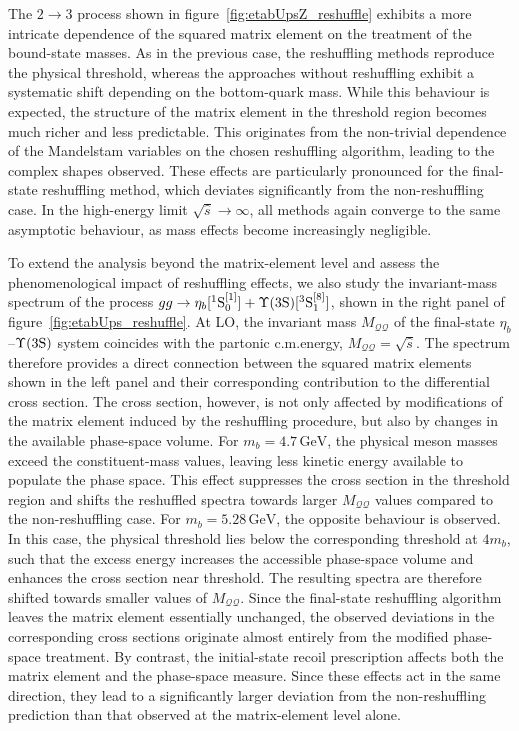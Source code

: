 The $2\to3$ process shown in figure~\ref{fig:etabUpsZ_reshuffle} exhibits a more intricate dependence of the squared matrix element on the treatment of the bound-state masses. As in the previous case, the reshuffling methods reproduce the physical threshold, whereas the approaches without reshuffling exhibit a systematic shift depending on the bottom-quark mass. While this behaviour is expected, the structure of the matrix element in the threshold region becomes much richer and less predictable. This originates from the non-trivial dependence of the Mandelstam variables on the chosen reshuffling algorithm, leading to the complex shapes observed. These effects are particularly pronounced for the final-state reshuffling method, which deviates significantly from the non-reshuffling case.
In the high-energy limit $\sqrt{\hat{s}}\to\infty$, all methods again converge to the same asymptotic behaviour, as mass effects become increasingly negligible.

To extend the analysis beyond the matrix-element level and assess the phenomenological impact of reshuffling effects, we also study the invariant-mass spectrum of the process $gg \to \eta_b[^1 \mathrm{S}_0^{[1]}] + \Upsilon(3\mathrm{S})[^3 \mathrm{S}_1^{[8]}]$, shown in the right panel of figure~\ref{fig:etabUps_reshuffle}. At LO, the invariant mass $M_{\mathcal{QQ}}$ of the final-state $\eta_b$--$\Upsilon(3\mathrm{S})$ system coincides with the partonic c.m.\@ energy, $M_{\mathcal{QQ}}=\sqrt{\hat s}$. The spectrum therefore provides a direct connection between the squared matrix elements shown in the left panel and their corresponding contribution to the differential cross section.
The cross section, however, is not only affected by modifications of the matrix element induced by the reshuffling procedure, but also by changes in the available phase-space volume. For $m_b=4.7\,\mathrm{GeV}$, the physical meson masses exceed the constituent-mass values, leaving less kinetic energy available to populate the phase space. This effect suppresses the cross section in the threshold region and shifts the reshuffled spectra towards larger $M_{\mathcal{QQ}}$ values compared to the non-reshuffling case. For $m_b=5.28\,\mathrm{GeV}$, the opposite behaviour is observed. In this case, the physical threshold lies below the corresponding threshold at $4m_b$, such that the excess energy increases the accessible phase-space volume and enhances the cross section near threshold. The resulting spectra are therefore shifted towards smaller values of $M_{\mathcal{QQ}}$.
Since the final-state reshuffling algorithm leaves the matrix element essentially unchanged, the observed deviations in the corresponding cross sections originate almost entirely from the modified phase-space treatment. By contrast, the initial-state recoil prescription affects both the matrix element and the phase-space measure. Since these effects act in the same direction, they lead to a significantly larger deviation from the non-reshuffling prediction than that observed at the matrix-element level alone.

